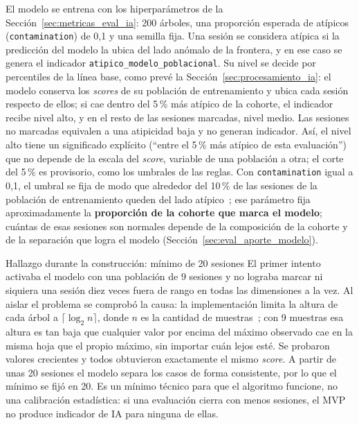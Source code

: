 El modelo se entrena con los hiperparámetros de la Sección~\ref{sec:metricas_eval_ia}: 200 árboles, una proporción esperada de atípicos (\texttt{contamination}) de 0{,}1 y una semilla fija. Una sesión se considera atípica si la predicción del modelo la ubica del lado anómalo de la frontera, y en ese caso se genera el indicador \texttt{atipico\_modelo\_poblacional}. Su nivel se decide por percentiles de la línea base, como prevé la Sección~\ref{sec:procesamiento_ia}: el modelo conserva los \textit{scores} de su población de entrenamiento y ubica cada sesión respecto de ellos; si cae dentro del 5\,\% más atípico de la cohorte, el indicador recibe nivel alto, y en el resto de las sesiones marcadas, nivel medio. Las sesiones no marcadas equivalen a una atipicidad baja y no generan indicador. Así, el nivel alto tiene un significado explícito (``entre el 5\,\% más atípico de esta evaluación'') que no depende de la escala del \textit{score}, variable de una población a otra; el corte del 5\,\% es provisorio, como los umbrales de las reglas. Con \texttt{contamination} igual a 0{,}1, el umbral se fija de modo que alrededor del 10\,\% de las sesiones de la población de entrenamiento queden del lado atípico~\parencite{ScikitLearnIF}; ese parámetro fija aproximadamente la \textbf{proporción de la cohorte que marca el modelo}; cuántas de esas sesiones son normales depende de la composición de la cohorte y de la separación que logra el modelo (Sección~\ref{sec:eval_aporte_modelo}).

\begin{keyfinding}{Hallazgo durante la construcción: mínimo de 20 sesiones}
El primer intento activaba el modelo con una población de 9 sesiones y no lograba marcar ni siquiera una sesión diez veces fuera de rango en todas las dimensiones a la vez. Al aislar el problema se comprobó la causa: la implementación limita la altura de cada árbol a $\lceil \log_2 n \rceil$, donde $n$ es la cantidad de muestras~\parencite{ScikitLearnIF}; con 9 muestras esa altura es tan baja que cualquier valor por encima del máximo observado cae en la misma hoja que el propio máximo, sin importar cuán lejos esté. Se probaron valores crecientes y todos obtuvieron exactamente el mismo \textit{score}. A partir de unas 20 sesiones el modelo separa los casos de forma consistente, por lo que el mínimo se fijó en 20. Es un mínimo técnico para que el algoritmo funcione, no una calibración estadística: si una evaluación cierra con menos sesiones, el MVP no produce indicador de IA para ninguna de ellas.
\end{keyfinding}

